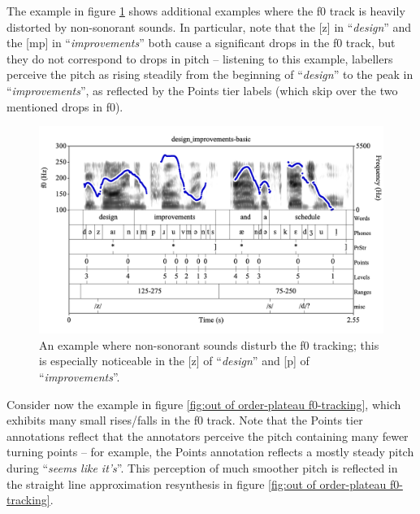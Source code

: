 \documentclass[11pt, twoside]{memoir}
\def\langtext#1{\textit{#1}}
\begin{document}
The example in figure \ref{fig:design improvements f0-tracking} shows additional examples where the f0 track is heavily distorted by non-sonorant sounds.  In particular, note that the [z] in “\langtext{design}” and the [mp] in “\langtext{improvements}” both cause a significant drops in the f0 track, but they do not correspond to drops in pitch – listening to this example, labellers perceive the pitch as rising steadily from the beginning of “\langtext{design}” to the peak in “\langtext{improvements}”, as reflected by the Points tier labels (which skip over the two mentioned drops in f0).

\begin{figure}[H]
\centering
%
\includegraphics[width=.875\linewidth]{Appendix-design_improvements.png}
%
\caption{An example where non-sonorant sounds disturb the f0 tracking; this is especially noticeable in the [z] of “\langtext{design}” and [p] of “\langtext{improvements}”.%
\label{fig:design improvements f0-tracking}%
%
}
\end{figure}

Consider now the example in figure \ref{fig:out of order-plateau f0-tracking}, which exhibits many small rises\slash falls in the f0 track. Note that the Points tier annotations reflect that the annotators perceive the pitch containing many fewer turning points – for example, the Points annotation reflects a mostly steady pitch during “\langtext{seems like it’s}”. This perception of much smoother pitch is reflected in the straight line approximation resynthesis in figure \ref{fig:out of order-plateau f0-tracking}.
\end{document}
